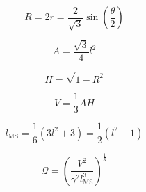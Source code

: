 \begin{equation} \label{eq:surf_tri_circumradius}
R = 2r = \frac{2}{\sqrt{3}} \sin\left(\frac{\theta}{2}\right)
\end{equation}

\begin{equation} \label{eq:surf_tri_area}
A = \frac{\sqrt{3}}{4}l^2
\end{equation}

\begin{equation} \label{eq:tet_height}
H = \sqrt{1-R^2}
\end{equation}

\begin{equation} \label{eq:tet_volume}
V = \frac13 A H
\end{equation}

\begin{equation} \label{eq:msl}
l_{\text{MS}} = \frac16(3l^2 + 3) = \frac12(l^2 + 1)
\end{equation}

\begin{equation} \label{angle_quality}
\mathcal{Q} = \left(\frac{V^2}{\gamma^2 l_{\text{MS}}^3}\right)^{\frac13}
\end{equation}
